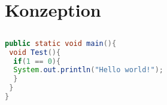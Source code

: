 \chapter{Konzeption}
\minitoc
\section{}

\begin{lstlisting}[language=java]
public static void main(){
 void Test(){
  if(1 == 0){
  System.out.println("Hello world!");
  }
 }
}
\end{lstlisting}
\lipsum
